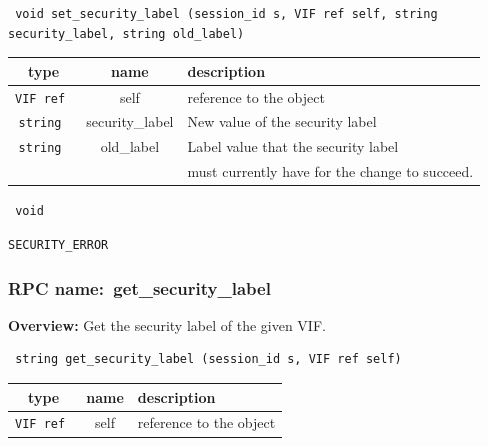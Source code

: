 \begin{verbatim} void set_security_label (session_id s, VIF ref self, string
security_label, string old_label)\end{verbatim}




\vspace{0.3cm}
\begin{tabular}{|c|c|p{7cm}|}
 \hline
{\bf type} & {\bf name} & {\bf description} \\ \hline
{\tt VIF ref } & self & reference to the object \\ \hline

{\tt string } & security\_label & New value of the security label \\ \hline
{\tt string } & old\_label & Label value that the security label \\
& & must currently have for the change to succeed.\\ \hline
\end{tabular}

\vspace{0.3cm}

{\tt
void
}


\vspace{0.3cm}

 {\tt SECURITY\_ERROR}

\vspace{0.3cm}
\vspace{0.3cm}
\vspace{0.3cm}
\subsubsection{RPC name:~get\_security\_label}

{\bf Overview:}
Get the security label of the given VIF.

\begin{verbatim} string get_security_label (session_id s, VIF ref self)\end{verbatim}





\vspace{0.3cm}
\begin{tabular}{|c|c|p{7cm}|}
 \hline
{\bf type} & {\bf name} & {\bf description} \\ \hline
{\tt VIF ref } & self & reference to the object \\ \hline

\end{tabular}


